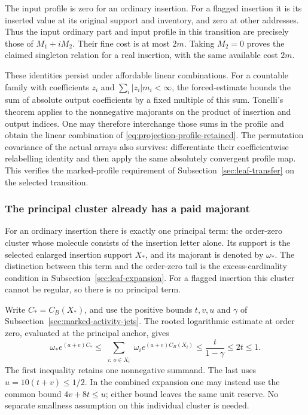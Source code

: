 The input profile is zero for an ordinary insertion. For a
flagged insertion it is its inserted value at its original
support and inventory, and zero at other addresses. Thus the
input ordinary part and input profile in this transition are
precisely those of $M_1+iM_2$. Their fine cost is at most $2m$.
Taking $M_2=0$ proves the claimed singleton relation for a real
insertion, with the same available cost $2m$.

These identities persist under affordable linear combinations.
For a countable family with coefficients $z_i$ and
$\sum_i|z_i|m_i<\infty$, the forced-estimate bounds the
sum of absolute output coefficients by a fixed multiple of this
sum. Tonelli's theorem applies to the nonnegative majorants on
the product of insertion and output indices. One may therefore
interchange those sums in the profile and obtain the linear
combination of \eqref{eq:projection-profile-retained}. The
permutation covariance of the actual arrays also survives:
differentiate their coefficientwise relabelling identity and
then apply the same absolutely convergent profile map.
This verifies the marked-profile requirement of
Subsection~\ref{sec:leaf-transfer} on the selected transition.

\subsubsection{The principal cluster already has a paid majorant}
For an ordinary insertion there is exactly one principal term:
the order-zero cluster whose molecule consists of the insertion
letter alone. Its support is the selected enlarged insertion support
$X_*$, and its majorant is denoted by $\omega_*$. The distinction
between this term and the order-zero tail is the excess-cardinality
condition in Subsection~\ref{sec:leaf-expansion}. For a flagged insertion
this cluster cannot be regular, so there is no principal term.

Write $C_*=C_B(X_*)$, and use the positive bounds $t,v,u$ and
$\gamma$ of Subsection~\ref{sec:marked-activity-jets}. The rooted
logarithmic estimate at order zero, evaluated at the principal
anchor, gives
\[
  \omega_*e^{(a+e)C_*}
  \le\sum_{\substack{i:\,o\in X_i}}
                         \omega_i e^{(a+e)C_B(X_i)}
  \le \frac{t}{1-\gamma}\le2t\le1.
\]
The first inequality retains one nonnegative summand. The last
uses $u=10(t+v)\le1/2$. In the combined expansion one may instead
use the common bound $4v+8t\le u$; either bound leaves the same
unit reserve. No separate smallness assumption on this individual
cluster is needed.

